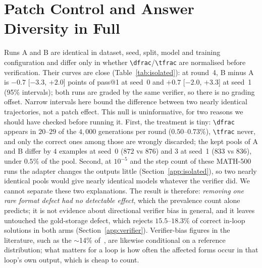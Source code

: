 \documentclass[runningheads]{llncs}
\begin{document}
\section{Patch Control and Answer Diversity in Full}
\label{app:control}

Runs A and B are identical in dataset, seed, split, model and training
configuration and differ only in whether \verb|\dfrac|/\verb|\tfrac| are
normalised before verification. Their curves are close
(Table~\ref{tab:isolated}): at round~4, B minus A is $-0.7$ [$-3.3$, $+2.0$] points of
pass@1 at seed~0 and $+0.7$ [$-2.0$, $+3.3$] at seed~1 (95\% intervals); both runs are graded by the same verifier, so there is no grading offset. Narrow intervals here bound the difference between two nearly identical
trajectories, not a patch effect. This null is uninformative, for two reasons
we should have checked before running it. First,
the treatment is tiny: \verb|\dfrac| appears in $20$--$29$ of the $4{,}000$
generations per round ($0.50$--$0.73\%$), \verb|\tfrac| never, and only the
correct ones among those are wrongly discarded; the kept pools of A and B differ
by $4$ examples at seed~0 ($872$ vs $876$) and $3$ at seed~1 ($833$ vs $836$),
under $0.5\%$ of the pool. Second, at $10^{-5}$ and the step count of these
MATH-500 runs the adapter changes the outputs little (Section~\ref{app:isolated}), so two nearly identical pools would give
nearly identical models whatever the verifier did. We cannot separate these
two explanations. The result is therefore: \emph{removing one rare format defect
had no detectable effect}, which the prevalence count alone predicts; it is not
evidence about directional verifier bias in general, and it leaves untouched the
gold-storage defect, which rejects $15.5$--$18.3\%$ of correct in-loop solutions
in both arms (Section~\ref{app:verifier}). Verifier-bias figures in
the literature, such as the $\sim$14\% of~\cite{ref_robustness}, are likewise
conditional on a reference distribution; what matters for a loop is how often
the affected forms occur in that loop's own output, which is cheap to count.
\end{document}
